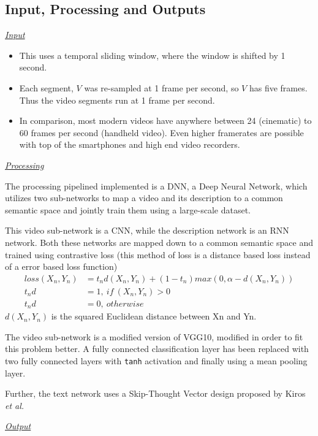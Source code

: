 			\subsection{Input, Processing and Outputs}
				
				\textit{\underline{Input}}
					\begin{itemize}
						\item This uses a temporal sliding window, where the window is shifted by 1 second. 
						\item Each segment, \(V\) was re-sampled at 1 frame per second, so \(V\) has five frames. Thus the video segments run at 1 frame per second. 
						\item In comparison, most modern videos have anywhere between 24 (cinematic) to 60 frames per second (handheld video). Even higher framerates are possible with top of the smartphones and high end video recorders.
					\end{itemize}
				\textit{\underline{Processing}}
					
					The processing pipelined implemented is a DNN, a Deep Neural Network, which utilizes two sub-networks to map a video and its description to a common semantic space and jointly train them using a large-scale dataset.
					
					This video sub-network is a CNN, while the description network is an RNN network. Both these networks are mapped down to a common semantic space and trained using contrastive loss (this method of loss is a distance based loss instead of a error based loss function)
					\begin{align}
						loss(X_n, Y_n) &= t_nd(X_n, Y_n) + (1 - t_n) max(0, \alpha - d(X_n, Y_n))\\
						t_nd &= 1,\ if\ (X_n,Y_n) > 0 \\
						t_nd &= 0,\ otherwise
					\end{align}
					\(d(X_n, Y_n)\) is the squared Euclidean distance between Xn and Yn.
					
					The video sub-network is a modified version of VGG10, modified in order to fit this problem better. A fully connected classification layer has been replaced with two fully connected layers with \texttt{tanh} activation and finally using a mean pooling layer.
					
					Further, the text network uses a Skip-Thought Vector design proposed by Kiros \textit{et al.} \cite{Kiros_2015}
					
				\textit{\underline{Output}}
				
